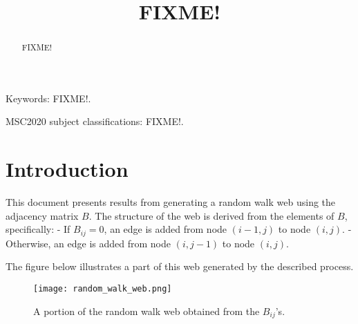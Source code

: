 \documentclass{article}
\title{FIXME!}
\author{}
\date{}
\begin{document}
\maketitle

\begin{abstract}
FIXME!
\end{abstract}

Keywords: FIXME!.

MSC2020 subject classifications: FIXME!.

\section*{Introduction}
This document presents results from generating a random walk web using the adjacency matrix \( B \). The structure of the web is derived from the elements of \( B \), specifically:
- If \( B_{ij} = 0 \), an edge is added from node \((i-1, j)\) to node \((i, j)\).
- Otherwise, an edge is added from node \((i, j-1)\) to node \((i, j)\).

The figure below illustrates a part of this web generated by the described process.

\begin{figure}[h]
    \centering
    \texttt{[image: random\_walk\_web.png]}
    \caption{A portion of the random walk web obtained from the \( B_{ij} \)'s.}
    \label{fig:random_walk_web}
\end{figure}
\end{document}
